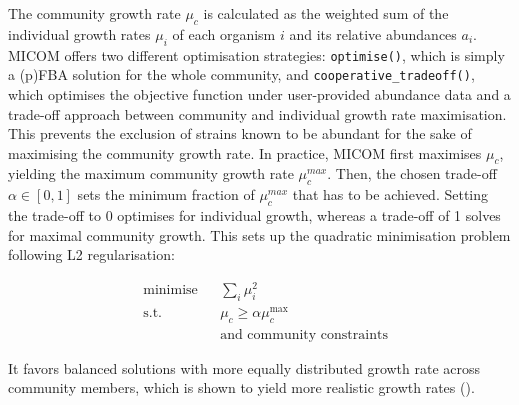 The community growth rate $\mu_c$ is calculated as the weighted sum of the individual growth rates $\mu_i$ of each organism $i$ and its relative abundances $a_i$. MICOM offers two different optimisation strategies: \texttt{optimise()}, which is simply a (p)FBA solution for the whole community, and \texttt{cooperative\_tradeoff()}, which optimises the objective function under user-provided abundance data and a trade-off approach between community and individual growth rate maximisation. This prevents the exclusion of strains known to be abundant for the sake of maximising the community growth rate. In practice, MICOM first maximises $\mu_c$, yielding the maximum community growth rate $\mu_c^{max}$. Then, the chosen trade-off $\alpha \in [0,1]$ sets the minimum fraction of $\mu_c^{max}$ that has to be achieved. Setting the trade-off to 0 optimises for individual growth, whereas a trade-off of 1 solves for maximal community growth. This sets up the quadratic minimisation problem following L2 regularisation: 

\begin{equation}
	\begin{aligned}
		&\text{minimise} & &\sum_{i} \mu_i^2 \\
		&\text{s.t.}     & &\mu_c \geq \alpha \mu_c^{\max} \\
		&                & &\text{and community constraints}
	\end{aligned}
\end{equation}
	
	
It favors balanced solutions with more equally distributed growth rate across community members, which is shown to yield more realistic growth rates (\cite{diener_micom_2020}). 

